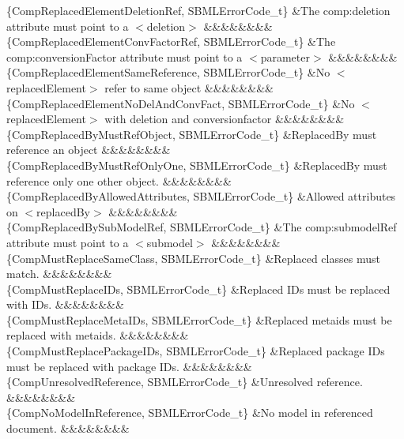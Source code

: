 \begin{DoxyParagraph}{}
\begin{longtabu}
\{Comp\+Replaced\+Element\+Deletion\+Ref, S\+B\+M\+L\+Error\+Code\+\_\+t\} &The \textquotesingle{}comp\+:deletion\textquotesingle{} attribute must point to a {\ttfamily $<$deletion$>$} &&&&&&&&\\
\{Comp\+Replaced\+Element\+Conv\+Factor\+Ref, S\+B\+M\+L\+Error\+Code\+\_\+t\} &The \textquotesingle{}comp\+:conversion\+Factor attribute must point to a {\ttfamily $<$parameter$>$} &&&&&&&&\\
\{Comp\+Replaced\+Element\+Same\+Reference, S\+B\+M\+L\+Error\+Code\+\_\+t\} &No {\ttfamily $<$replaced\+Element$>$} refer to same object &&&&&&&&\\
\{Comp\+Replaced\+Element\+No\+Del\+And\+Conv\+Fact, S\+B\+M\+L\+Error\+Code\+\_\+t\} &No {\ttfamily $<$replaced\+Element$>$} with deletion and conversionfactor &&&&&&&&\\
\{Comp\+Replaced\+By\+Must\+Ref\+Object, S\+B\+M\+L\+Error\+Code\+\_\+t\} &Replaced\+By must reference an object &&&&&&&&\\
\{Comp\+Replaced\+By\+Must\+Ref\+Only\+One, S\+B\+M\+L\+Error\+Code\+\_\+t\} &Replaced\+By must reference only one other object. &&&&&&&&\\
\{Comp\+Replaced\+By\+Allowed\+Attributes, S\+B\+M\+L\+Error\+Code\+\_\+t\} &Allowed attributes on {\ttfamily $<$replaced\+By$>$} &&&&&&&&\\
\{Comp\+Replaced\+By\+Sub\+Model\+Ref, S\+B\+M\+L\+Error\+Code\+\_\+t\} &The \textquotesingle{}comp\+:submodel\+Ref\textquotesingle{} attribute must point to a {\ttfamily $<$submodel$>$} &&&&&&&&\\
\{Comp\+Must\+Replace\+Same\+Class, S\+B\+M\+L\+Error\+Code\+\_\+t\} &Replaced classes must match. &&&&&&&&\\
\{Comp\+Must\+Replace\+I\+Ds, S\+B\+M\+L\+Error\+Code\+\_\+t\} &Replaced I\+Ds must be replaced with I\+Ds. &&&&&&&&\\
\{Comp\+Must\+Replace\+Meta\+I\+Ds, S\+B\+M\+L\+Error\+Code\+\_\+t\} &Replaced metaids must be replaced with metaids. &&&&&&&&\\
\{Comp\+Must\+Replace\+Package\+I\+Ds, S\+B\+M\+L\+Error\+Code\+\_\+t\} &Replaced package I\+Ds must be replaced with package I\+Ds. &&&&&&&&\\
\{Comp\+Unresolved\+Reference, S\+B\+M\+L\+Error\+Code\+\_\+t\} &Unresolved reference. &&&&&&&&\\
\{Comp\+No\+Model\+In\+Reference, S\+B\+M\+L\+Error\+Code\+\_\+t\} &No model in referenced document. &&&&&&&&\\

\end{longtabu}
\end{DoxyParagraph}
